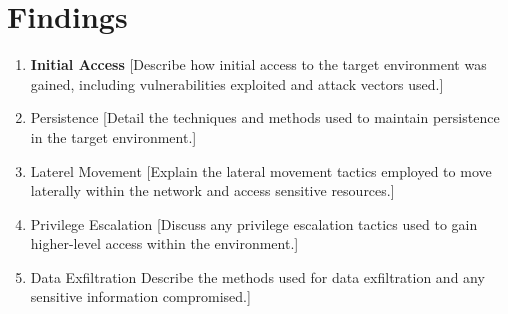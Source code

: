 \section{Findings}
\begin{enumerate}
\item \textbf{Initial Access}
[Describe how initial access to the target environment was gained, including vulnerabilities exploited and attack vectors used.]
\item Persistence
[Detail the techniques and methods used to maintain persistence in the target environment.]
\item Laterel Movement
[Explain the lateral movement tactics employed to move laterally within the network and access sensitive resources.]
\item Privilege Escalation
[Discuss any privilege escalation tactics used to gain higher-level access within the environment.]
\item Data Exfiltration
Describe the methods used for data exfiltration and any sensitive information compromised.]

\end{enumerate}

